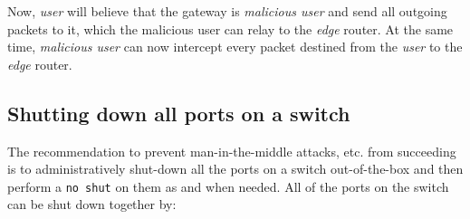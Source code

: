 Now, \textit{user} will believe that the gateway is \textit{malicious user} and send all outgoing packets to it, which the malicious user can relay to the \textit{edge} router. At the same time, \textit{malicious user} can now intercept every packet destined from the \textit{user} to the \textit{edge} router. 

\subsection{Shutting down all ports on a switch}
The recommendation to prevent man-in-the-middle attacks, etc. from succeeding is to administratively shut-down all the ports on a switch out-of-the-box and then perform a \verb|no shut| on them as and when needed. All of the ports on the switch can be shut down together by:


